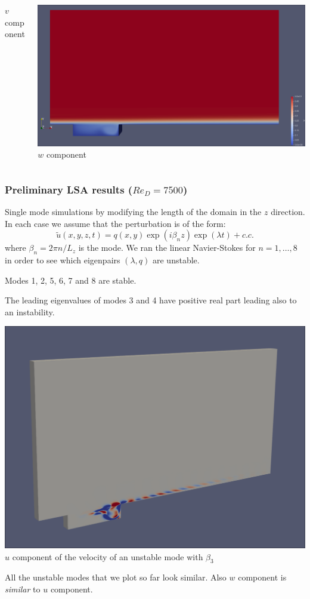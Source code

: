 \documentclass[
	aspectratio=169, %
	t, %
	onlytextwidth, %
	10pt, %
]{beamer}
\begin{document}
\begin{frame}
\begin{columns}[T]
\begin{column}{0.3\linewidth}
			{\tiny\textcolor{ICLBlue}{$v$ component}}
		\end{column}
		\begin{column}{0.3\linewidth} %
			\includegraphics[width=\linewidth]{Images/baseflowW.png}\\[3pt]
			{\tiny\textcolor{ICLBlue}{$w$ component}}
		\end{column}
	\end{columns}
\end{frame}
\begin{frame}
	\frametitle{Preliminary LSA results ($Re_D = 7500$)}

	Single mode simulations by modifying the length of the domain in the $z$ direction. In each case we assume that the perturbation is of the form:
	$$
		\tilde{u}(x,y,z,t) = q(x,y) \exp(i\beta_n z) \exp(\lambda t)+c.c.
	$$
	where $\beta_n=2\pi n/L_z$ is the mode.
	We ran the linear Navier-Stokes for $n=1,\ldots,8$ in order to see which eigenpairs $(\lambda, q)$ are unstable.

	Modes 1, 2, 5, 6, 7 and 8 are stable.

	The leading eigenvalues of modes 3 and 4 have positive real part leading also to an instability.
\end{frame}

\begin{frame}

	\begin{center}
		\includegraphics[width=0.5\linewidth]{Images/mode3_u.png}\\[3pt]
		{\tiny\textcolor{ICLBlue}{$u$ component of the velocity of an unstable mode with $\beta_3$}}
	\end{center}


	All the unstable modes that we plot so far look similar. Also $w$ component is \textit{similar} to $u$ component.
\end{frame}
\end{document}
